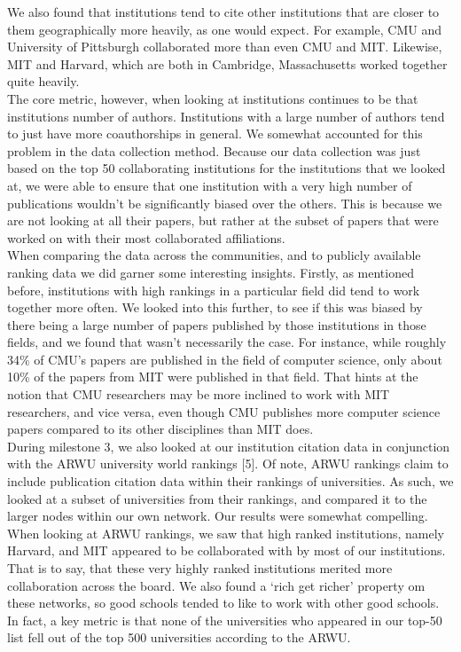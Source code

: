 \documentclass[times, 10pt,twocolumn]{article}
\begin{document}
We also found that institutions tend to cite other institutions that are closer to them geographically more heavily, as one would expect. For example, CMU and University of Pittsburgh collaborated more than even CMU and MIT. Likewise, MIT and Harvard, which are both in Cambridge, Massachusetts worked together quite heavily. \\

The core metric, however, when looking at institutions continues to be that institutions number of authors. Institutions with a large number of authors tend to just have more coauthorships in general.  We somewhat accounted for this problem in the data collection method. Because our data collection was just based on the top 50 collaborating institutions for the institutions that we looked at, we were able to ensure that one institution with a very high number of publications wouldn’t be significantly biased over the others. This is because we are not looking at all their papers, but rather at the subset of papers that were worked on with their most collaborated affiliations. \\

When comparing the data across the communities, and to publicly available ranking data we did garner some interesting insights. Firstly, as mentioned before, institutions with high rankings in a particular field did tend to work together more often. We looked into this further, to see if this was biased by there being a large number of papers published by those institutions in those fields, and we found that wasn’t necessarily the case. For instance, while roughly 34\% of CMU’s papers are published in the field of computer science, only about 10\% of the papers from MIT were published in that field. That hints at the notion that CMU researchers may be more inclined to work with MIT researchers, and vice versa, even though CMU publishes more computer science papers compared to its other disciplines than MIT does. \\

During milestone 3, we also looked at our institution citation data in conjunction with the ARWU university world rankings [5]. Of note, ARWU rankings claim to include publication citation data within their rankings of universities. As such, we looked at a subset of universities from their rankings, and compared it to the larger nodes within our own network. Our results were somewhat compelling. \\

When looking at ARWU rankings, we saw that high ranked institutions, namely Harvard, and MIT appeared to be collaborated with by most of our institutions. That is to say, that these very highly ranked institutions merited more collaboration across the board. We also found a `rich get richer' property om these networks, so good schools tended to like to work with other good schools. In fact, a key metric is that none of the universities who appeared in our top-50 list fell out of the top 500 universities according to the ARWU.\\
\end{document}

